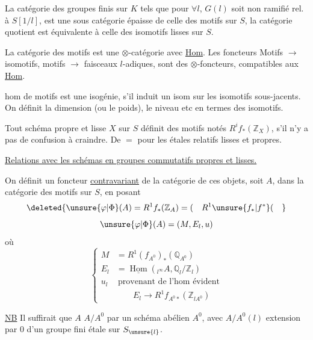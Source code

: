
La catégorie des groupes finis  sur \(K\) tels que pour
\(\forall l\), \(G(l)\) soit non ramifié rel. à \(S[1/l]\), est une sous
catégorie épaisse de celle des motifs sur \(S\), la catégorie
quotient est équivalente à celle des isomotifs lisses sur \(S\).

La catégorie des motifs est une \(\otimes\)-catégorie avec
\uline{Hom}. Les foncteurs Motifs \(\longrightarrow\) isomotifs, motifs \(\longrightarrow\)
faisceaux \(l\)-adiques, sont des \(\otimes\)-foncteurs, compatibles aux
\uline{Hom}.

  hom de motifs est une isogénie, s'il induit
un isom sur les isomotifs sous-jacents. On définit
la dimension (ou le poids), le niveau etc en termes
des isomotifs.

Tout schéma propre et lisse \(X\) sur \(S\) définit des
motifs  notés \(R^if_*(\mathbb Z_X)\), s'il n'y a pas de confusion à
craindre. De \(=\) pour les  étales relatifs lisses et propres.

\uline{Relations avec les schémas en groupes commutatifs propres et lisses.}

On définit un foncteur \uline{contravariant} de la catégorie de
ces objets, soit \(A\), dans la catégorie des motifs sur \(S\),
en posant
\[
\deleted{\unsure{\varphi|\Phi}(A)=R^1f_*(\mathbb Z_A)=
(\quad R^1\unsure{f_*|f^*}(\quad}
\]
\[
\unsure{\varphi|\Phi}(A)=(M,E_l,u)
\]
où
\[
\left\{
\begin{aligned}
M&=R^1(f_{A^0})_*(\mathbb Q_{A^0})\\
E_l&=\underline{\operatorname{Hom}}({}_{l^\infty}A,\mathbb Q_l/\mathbb Z_l)\\
u_l&\ \text{provenant de l'hom évident}\\
&\qquad E_l\longrightarrow R^1f_{A^0*}(\mathbb Z_{lA^0})
\end{aligned}
\right.
\]

\uline{NB} Il suffirait que \(A\)
 \(A/A^0\) par un schéma abélien \(A^0\), avec
\(A/A^0(l)\) extension par \(0\) d'un groupe fini étale sur \(S_{\unsure{l}}\).
